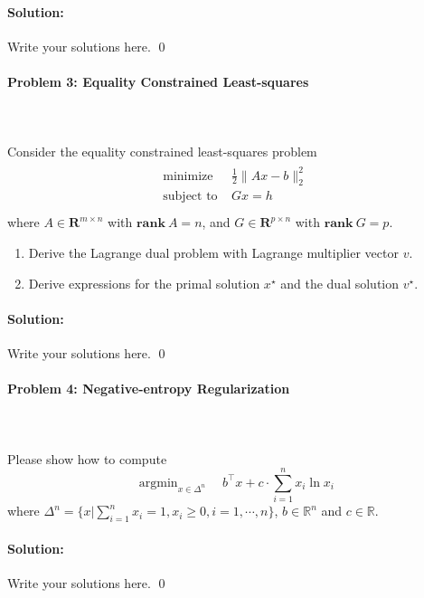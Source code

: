 \documentclass[a4paper]{article}
\DeclareMathOperator*{\argmin}{argmin}
\newenvironment{solution}
{\color{blue} \paragraph{Solution:\\}}
{\newline \qed}
\begin{document}
\begin{solution}
    Write your solutions here.
\end{solution}


\paragraph{Problem 3: Equality Constrained Least-squares}
~\\
~\\
Consider the equality constrained least-squares problem
\begin{gather*}
\begin{matrix}
\text{minimize~~} & \frac{1}{2}\|Ax-b\|_2^2\\
\text{subject to} & Gx=h~~\\
\end{matrix}
\end{gather*}
where $A\in\mathbf{R}^{m\times n}$ with $\mathbf{rank}~A=n$, and $G\in\mathbf{R}^{p\times n}$ with $\mathbf{rank}~G=p$.
\begin{enumerate}[(1)]
    \item Derive the Lagrange dual problem with Lagrange multiplier vector $v$.
    \item Derive expressions for the primal solution $x^\star$ and the dual solution $v^\star$.
\end{enumerate}

\begin{solution}
    Write your solutions here.
\end{solution}

\paragraph{Problem 4: Negative-entropy Regularization}
~\\
~\\
Please show how to compute
\begin{equation*}
\argmin_{x\in \Delta^n} \quad b^\top x+c\cdot\sum_{i=1}^n x_i\ln x_i
\end{equation*}
where $\Delta^n=\{x|\sum_{i=1}^n x_i=1,x_i\geq0,i=1,\cdots,n\}$, $b\in\mathbb{R}^n$ and $c\in\mathbb{R}$.

\begin{solution}
    Write your solutions here.
\end{solution}
\end{document}
